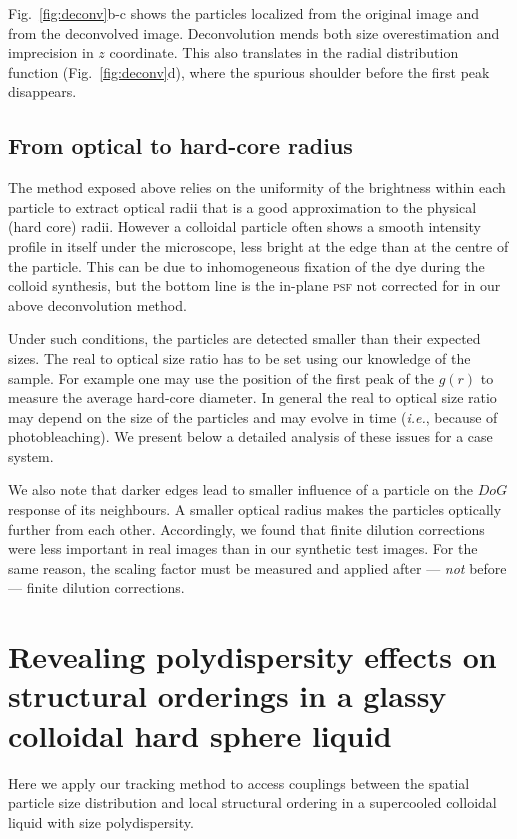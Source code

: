 \documentclass[8.5pt,twoside,twocolumn]{article}
\begin{document}
Fig.~\ref{fig:deconv}b-c shows the particles localized from the original image and from the deconvolved image. Deconvolution mends both size overestimation and imprecision in $z$ coordinate. This also translates in the radial distribution function (Fig.~\ref{fig:deconv}d), where the spurious shoulder before the first peak disappears.

\subsection{From optical to hard-core radius}

The method exposed above relies on the uniformity of the brightness within each particle to extract optical radii that is a good approximation to the physical (hard core) radii. However a colloidal particle often shows a smooth intensity profile in itself under the microscope, less bright at the edge than at the centre of the particle. This can be due to inhomogeneous fixation of the dye during the colloid synthesis, but the bottom line is the in-plane \textsc{psf} not corrected for in our above deconvolution method.

Under such conditions, the particles are detected smaller than their expected sizes. The real to optical size ratio has to be set using our knowledge of the sample. For example one may use the position of the first peak of the $g(r)$ to measure the average hard-core diameter. In general the real to optical size ratio may depend on the size of the particles and may evolve in time (\emph{i.e.}, because of photobleaching). We present below a detailed analysis of these issues for a case system. 

We also note that darker edges lead to smaller influence of a particle on the $DoG$ response of its neighbours. A smaller optical radius makes the particles optically further from each other. Accordingly, we found that finite dilution corrections were less important in real images than in our synthetic test images. For the same reason, the scaling factor must be measured and applied after --- \emph{not} before --- finite dilution corrections.


\section{Revealing polydispersity effects on structural orderings in a glassy colloidal hard sphere liquid}
\label{sec:yon6}

Here we apply our tracking method to access couplings between the spatial particle size distribution and local structural ordering 
in a supercooled colloidal liquid with size polydispersity.  
\end{document}
